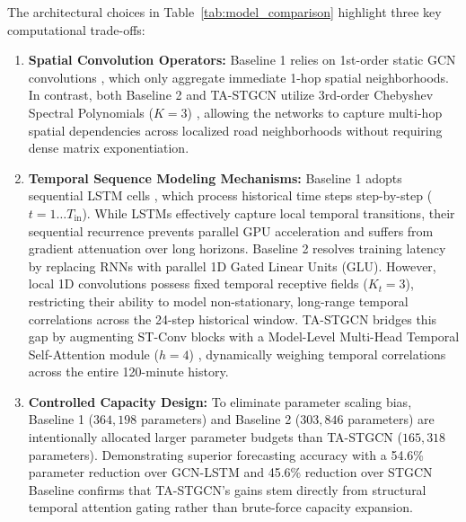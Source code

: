 The architectural choices in Table~\ref{tab:model_comparison} highlight three key computational trade-offs:
\begin{enumerate}
    \item \textbf{Spatial Convolution Operators:} Baseline 1 relies on 1st-order static GCN convolutions \cite{gcn, tgcn, gclstm}, which only aggregate immediate 1-hop spatial neighborhoods. In contrast, both Baseline 2 \cite{stgcn} and TA-STGCN utilize 3rd-order Chebyshev Spectral Polynomials ($K=3$) \cite{chebnet}, allowing the networks to capture multi-hop spatial dependencies across localized road neighborhoods without requiring dense matrix exponentiation.
    \item \textbf{Temporal Sequence Modeling Mechanisms:} Baseline 1 adopts sequential LSTM cells \cite{tgcn, gclstm}, which process historical time steps step-by-step ($t=1 \dots T_{\text{in}}$). While LSTMs effectively capture local temporal transitions, their sequential recurrence prevents parallel GPU acceleration and suffers from gradient attenuation over long horizons. Baseline 2 \cite{stgcn} resolves training latency by replacing RNNs with parallel 1D Gated Linear Units (GLU). However, local 1D convolutions possess fixed temporal receptive fields ($K_t=3$), restricting their ability to model non-stationary, long-range temporal correlations across the 24-step historical window. TA-STGCN bridges this gap by augmenting ST-Conv blocks with a Model-Level Multi-Head Temporal Self-Attention module ($h=4$) \cite{attention}, dynamically weighing temporal correlations across the entire 120-minute history.
    \item \textbf{Controlled Capacity Design:} To eliminate parameter scaling bias, Baseline 1 ($364,198$ parameters) and Baseline 2 ($303,846$ parameters) are intentionally allocated larger parameter budgets than TA-STGCN ($165,318$ parameters). Demonstrating superior forecasting accuracy with a 54.6\% parameter reduction over GCN-LSTM \cite{gcn, tgcn, gclstm} and 45.6\% reduction over STGCN Baseline \cite{stgcn} confirms that TA-STGCN's gains stem directly from structural temporal attention gating \cite{attention} rather than brute-force capacity expansion.
\end{enumerate}

